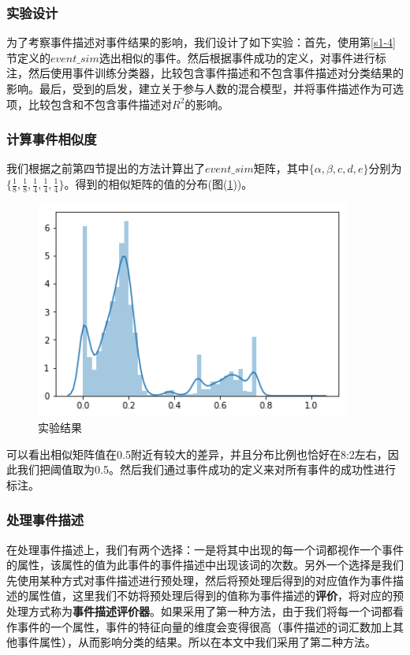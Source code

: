 \documentclass[12pt]{template}
\begin{document}
\subsubsection{实验设计}
为了考察事件描述对事件结果的影响，我们设计了如下实验：首先，使用第\ref{s1-4}节定义的\(event\_sim\)选出相似的事件。然后根据事件成功的定义，对事件进行标注，然后使用事件训练分类器，比较包含事件描述和不包含事件描述对分类结果的影响。最后，受到\citep{noauthor_predicting_nodate}的启发，建立关于参与人数的混合模型，并将事件描述作为可选项，比较包含和不包含事件描述对\(R^2\)的影响。

\subsubsection{计算事件相似度}
我们根据之前第四节提出的方法计算出了\(event\_sim\)矩阵，其中\(\{\alpha,\beta,{c},{d},{e}\}\)分别为\(\{\frac{1}{8},\frac{1}{8},\frac{1}{4},\frac{1}{4},\frac{1}{4}\}\)。得到的相似矩阵的值的分布(图(\ref{f1-1}))。

\begin{figure}[htbp]
  \centering
  \includegraphics[width=10.4cm]{event_sim_dist.png}
  \caption{实验结果}
  \label{f1-1}
\end{figure}

可以看出相似矩阵值在0.5附近有较大的差异，并且分布比例也恰好在8:2左右，因此我们把阈值取为0.5。然后我们通过事件成功的定义来对所有事件的成功性进行标注。

\subsubsection{处理事件描述}
在处理事件描述上，我们有两个选择：一是将其中出现的每一个词都视作一个事件的属性，该属性的值为此事件的事件描述中出现该词的次数。另外一个选择是我们先使用某种方式对事件描述进行预处理，然后将预处理后得到的对应值作为事件描述的属性值，这里我们不妨将预处理后得到的值称为事件描述的\textbf{评价}，将对应的预处理方式称为\textbf{事件描述评价器}。如果采用了第一种方法，由于我们将每一个词都看作事件的一个属性，事件的特征向量的维度会变得很高（事件描述的词汇数加上其他事件属性），从而影响分类的结果。所以在本文中我们采用了第二种方法。
\end{document}
